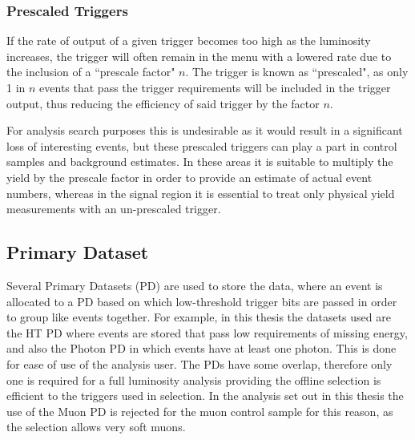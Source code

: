 \subsubsection{Prescaled Triggers}
If the rate of output of a given trigger becomes too high as the luminosity increases, the trigger will often remain in the menu with a lowered rate due to the inclusion of a ``prescale factor" $n$. The trigger is known as ``prescaled", as only 1 in $n$ events that pass the trigger requirements will be included in the trigger output, thus reducing the efficiency of said trigger by the factor $n$. 

For analysis search purposes this is undesirable as it would result in a significant loss of interesting events, but these prescaled triggers can play a part in control samples and background estimates. In these areas it is suitable to multiply the yield by the prescale factor in order to provide an estimate of actual event numbers, whereas in the signal region it is essential to treat only physical yield measurements with an un-prescaled trigger.
\subsection{Primary Dataset}
Several Primary Datasets (PD) are used to store the data, where an event is allocated to a PD based on which low-threshold trigger bits are passed in order to group like events together. For example, in this thesis the datasets used are the HT PD where events are stored that pass low requirements of missing energy, and also the Photon PD in which events have at least one photon. This is done for ease of use of the analysis user. The PDs have some overlap, therefore only one is required for a full luminosity analysis providing the offline selection is efficient to the triggers used in selection. In the analysis set out in this thesis the use of the Muon PD is rejected for the muon control sample for this reason, as the selection allows very soft muons. 


